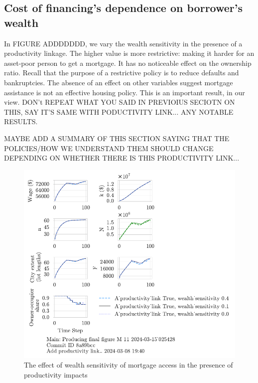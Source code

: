 \newpage
\subsection{Cost of financing's dependence on borrower's wealth}
{\color{red}In FIGURE ADDDDDDD}, we vary the wealth sensitivity in the presence of a productivity linkage. The higher value is more restrictive:  making it harder for an asset-poor person to get a mortgage. It has no noticeable effect on the ownership ratio. Recall that the purpose of a restrictive policy is to reduce defaults and bankruptcies. The absence of an effect on other variables suggest mortgage assistance is not an effective housing policy.  This is an important result, in our view. {\color{red}DON't REPEAT WHAT YOU SAID IN PREVIOIUS SECIOTN ON THIS, SAY IT'S SAME WITH PODUCTIVITY LINK... ANY NOTABLE RESULTS. }


{\color{red} MAYBE ADD A SUMMARY OF THIS SECTION SAYING THAT THE POLICIES/HOW WE UNDERSTAND THEM SHOULD CHANGE DEPENDING ON WHETHER THERE IS THIS PRODUCTIVITY LINK...}


\begin{figure}[h!bt]
    \centering
    \includegraphics[scale=1, trim={0 1.4cm 0 0},clip]{fig/With-productivity_link-wealth_sensitivity-025428.pdf}
    \caption{The effect of wealth sensitivity of mortgage access in the presence of productivity impacts}
    \label{fig:Productivity_link_and_wealth_sensitivity_ownership_trajectory}
\end{figure}


